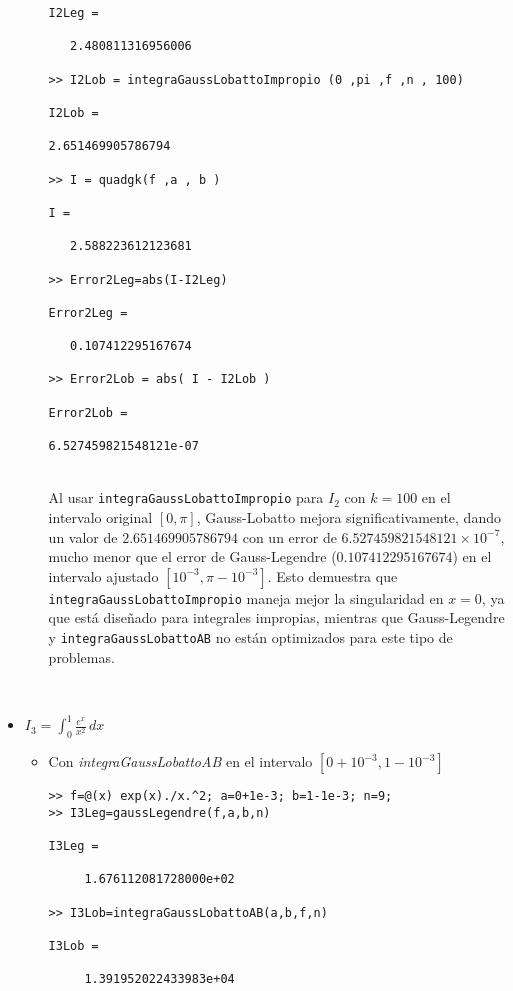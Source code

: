 \documentclass[a4paper]{article}
\begin{document}
\begin{itemize}
\begin{itemize}
\begin{lstlisting}[frame=single, style=Matlab-Pyglike]
I2Leg =

   2.480811316956006

>> I2Lob = integraGaussLobattoImpropio (0 ,pi ,f ,n , 100)

I2Lob =

2.651469905786794

>> I = quadgk(f ,a , b )

I =

   2.588223612123681

>> Error2Leg=abs(I-I2Leg)

Error2Leg =

   0.107412295167674

>> Error2Lob = abs( I - I2Lob )

Error2Lob =

6.527459821548121e-07
\end{lstlisting}
\\
Al usar \texttt{integraGaussLobattoImpropio} para \( I_2 \) con \( k = 100 \) en el intervalo original \( [0, \pi] \), Gauss-Lobatto mejora significativamente, dando un valor de \( 2.651469905786794 \) con un error de \( 6.527459821548121 \times 10^{-7} \), mucho menor que el error de Gauss-Legendre (\( 0.107412295167674 \)) en el intervalo ajustado \( [10^{-3}, \pi - 10^{-3}] \). Esto demuestra que \texttt{integraGaussLobattoImpropio} maneja mejor la singularidad en \( x = 0 \), ya que está diseñado para integrales impropias, mientras que Gauss-Legendre y \texttt{integraGaussLobattoAB} no están optimizados para este tipo de problemas.
\end{itemize}
\\

\item $\displaystyle I_3=\int_{0}^{1} \! \frac{e^x}{x^2}  \,dx$
\\
\begin{itemize}
    \item Con \textit{integraGaussLobattoAB} en el intervalo $[0+10^{-3},1-10^{-3}]$
    \\
    \begin{lstlisting}[frame=single, style=Matlab-Pyglike]
>> f=@(x) exp(x)./x.^2; a=0+1e-3; b=1-1e-3; n=9;
>> I3Leg=gaussLegendre(f,a,b,n)

I3Leg =

     1.676112081728000e+02

>> I3Lob=integraGaussLobattoAB(a,b,f,n)

I3Lob =

     1.391952022433983e+04


\end{lstlisting}
\end{itemize}
\end{itemize}
\end{document}
